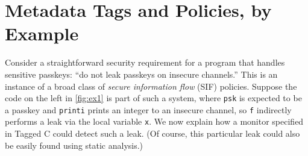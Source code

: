 \documentclass{llncs}
\begin{document}
\section{Metadata Tags and Policies, by Example}
\label{sec:example}

Consider a straightforward security requirement for a program that handles sensitive passkeys:
``do not leak passkeys on insecure channels.'' This is an instance of a broad class of
{\em secure information flow} (SIF) policies. Suppose the code on the left in \cref{fig:ex1} is part of
such a system, where {\tt psk} is expected to be a passkey and {\tt printi}
prints an integer to an insecure channel, so {\tt f} indirectly performs a leak via the
local variable {\tt x}.  We now explain how a monitor specified in Tagged C could detect
such a leak. (Of course, this particular leak could also be easily found using static analysis.)
\end{document}
